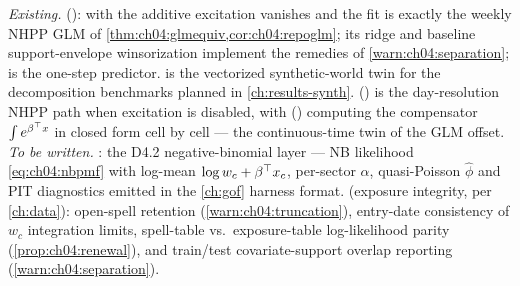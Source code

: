 \begin{codehooks}
\emph{Existing.} 
(): with  the additive
excitation vanishes and the fit is exactly the weekly NHPP GLM of
\cref{thm:ch04:glmequiv,cor:ch04:repoglm}; its ridge  and
baseline support-envelope winsorization implement the remedies of
\cref{warn:ch04:separation};  is the one-step
predictor. 
is the vectorized synthetic-world twin for the decomposition benchmarks
planned in \cref{ch:results-synth}. 
() is the day-resolution NHPP
path when excitation is disabled, with
() computing the
compensator $\int e^{\beta^{\top}x}$ in closed form cell by cell ---
the continuous-time twin of the GLM offset. \emph{To be written.}
: the D4.2 negative-binomial layer ---
NB likelihood \cref{eq:ch04:nbpmf} with log-mean $\log w_c +
\beta^{\top}x_c$, per-sector $\alpha$, quasi-Poisson $\hat\phi$ and PIT
diagnostics emitted in the \cref{ch:gof} harness format.
 (exposure integrity, per \cref{ch:data}):
open-spell retention (\cref{warn:ch04:truncation}), entry-date
consistency of $w_c$ integration limits, spell-table vs.\ exposure-table
log-likelihood parity (\cref{prop:ch04:renewal}), and train/test
covariate-support overlap reporting (\cref{warn:ch04:separation}).
\end{codehooks}

